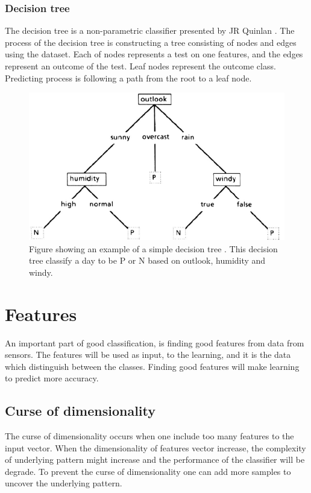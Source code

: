 \documentclass[USenglish]{ifimaster}  %
\begin{document}
\subsubsection{Decision tree}
The decision tree is a non-parametric classifier presented by JR Quinlan \cite{Quinlan1986}. The process of the decision tree is constructing a tree consisting of nodes and edges using the dataset. Each of nodes represents a test on one features, and the edges represent an outcome of the test. Leaf nodes represent the outcome class. Predicting process is following a path from the root to a leaf node.


\begin{figure}[h]
	\centering
	\includegraphics[scale=0.5]{Figures/decisionTree.PNG}
	\caption{Figure showing an example of a simple decision tree \cite{Quinlan1986}. This decision tree classify a day to be P or N based on outlook, humidity and windy.}
	\label{fig:SVM}
\end{figure}


\section{Features} \label{features}
An important part of good classification, is finding good features from data from sensors. The features will be used as input, to the learning, and it is the data which distinguish between the classes. Finding good features will make learning to predict more accuracy.

\subsection{Curse of dimensionality}\label{curseDim}
The curse of dimensionality occurs when one include too many features to the input vector. When the dimensionality of features vector increase, the complexity of underlying pattern might increase and the performance of the classifier will be degrade. To prevent the curse of dimensionality one can add more samples to uncover the underlying pattern.
\end{document}
